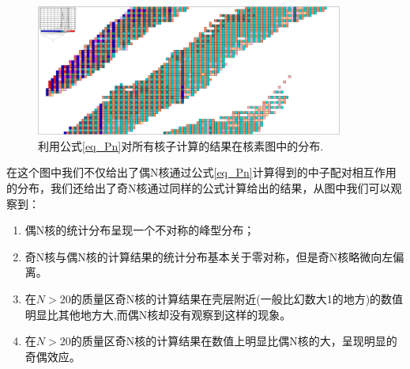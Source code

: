 \begin{figure}[H]
\centering
\includegraphics[width=0.9\textwidth]{figure/oV1n1n.pdf}
\caption{利用公式\ref{eq_Pn}对所有核子计算的结果在核素图中的分布.\label{fig_oV1n1n}}
\end{figure}
在这个图中我们不仅给出了偶N核通过公式\ref{eq_Pn}计算得到的中子配对相互作用的分布，我们还给出了奇N核通过同样的公式计算给出的结果，从图中我们可以观察到：
\begin{enumerate}
  \item 偶N核的统计分布呈现一个不对称的峰型分布；
  \item 奇N核与偶N核的计算结果的统计分布基本关于零对称，但是奇N核略微向左偏离。
  \item 在$N>20$的质量区奇N核的计算结果在壳层附近(一般比幻数大1的地方)的数值明显比其他地方大,而偶N核却没有观察到这样的现象。
  \item 在$N>20$的质量区奇N核的计算结果在数值上明显比偶N核的大，呈现明显的奇偶效应。
\end{enumerate}

